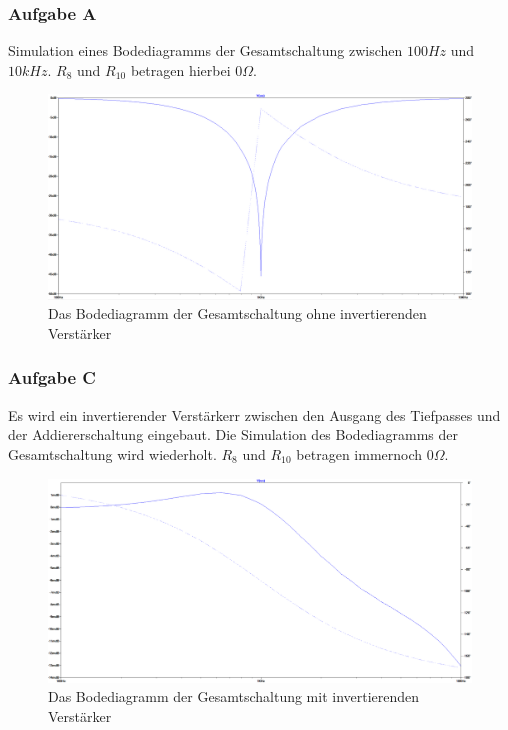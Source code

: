 \subsubsection{Aufgabe A}
\label{A}
Simulation eines Bodediagramms der Gesamtschaltung zwischen $\si{100}{Hz}$ und $\si{10}{kHz}$.
\newline $R_{8}$ und $R_{10}$ betragen hierbei $\si{0}{\Omega}$.
\begin{figure}[h]
\includegraphics[width=14cm]{pics/BodeAd_ohneInv}
\caption{Das Bodediagramm der Gesamtschaltung ohne invertierenden Verstärker}
\label{bodeA}
\end{figure}


\subsubsection{Aufgabe C}
\label{C}
Es wird ein invertierender Verstärkerr zwischen den Ausgang des Tiefpasses und der Addiererschaltung eingebaut. Die Simulation des Bodediagramms der Gesamtschaltung wird wiederholt. $R_{8}$ und $R_{10}$ betragen immernoch $\si{0}{\Omega}$.
\begin{figure}[h]
\includegraphics[width=14cm]{pics/BodeAd_mitInv}
\caption{Das Bodediagramm der Gesamtschaltung mit invertierenden Verstärker}
\label{bodeC}
\end{figure}

